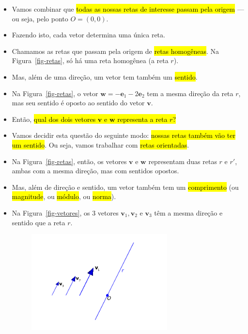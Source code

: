 \documentclass[
  letterpaper,
  DIV=11,
  numbers=noendperiod]{scrreprt}
\begin{document}
\begin{itemize}
\begin{figure}[htb]
  \end{figure}
\item
  Vamos combinar que {\hl{todas as nossas retas de interesse passam pela
  origem}} --- ou seja, pelo ponto $O=(0,0)$.
\item
  Fazendo isto, cada vetor determina uma única reta.
\item
  Chamamos as retas que passam pela origem de {\hl{retas homogêneas}}.
  Na Figura~\ref{fig-retas}, só há uma reta homogênea (a reta $r$).
\item
  Mas, além de uma direção, um vetor tem também um {\hl{sentido}}.
\item
  Na Figura~\ref{fig-retas}, o vetor
  $\mathbf{w} = -\mathbf{e}_{1} - 2\mathbf{e}_{2}$ tem a mesma direção
  da reta $r$, mas seu sentido é oposto ao sentido do vetor
  $\mathbf{v}$.
\item
  Então, {\hl{qual dos dois vetores $\mathbf{v}$ e $\mathbf{w}$
  representa a reta $r$?}}
\item
  Vamos decidir esta questão do seguinte modo: {\hl{nossas retas também
  vão ter um sentido}}. Ou seja, vamos trabalhar com {\hl{retas
  orientadas}}.
\item
  Na Figura~\ref{fig-retas}, então, os vetores $\mathbf{v}$ e
  $\mathbf{w}$ representam duas retas $r$ e $r'$, ambas com a mesma
  direção, mas com sentidos opostos.
\item
  Mas, além de direção e sentido, um vetor também tem um
  {\hl{comprimento}} (ou {\hl{magnitude}}, ou {\hl{módulo}}, ou
  {\hl{norma}}).
\item
  Na Figura~\ref{fig-vetores}, os $3$ vetores
  $\mathbf{v}_1, \mathbf{v}_2$ e $\mathbf{v}_3$ têm a mesma direção e
  sentido que a reta $r$.

  \begin{figure}[htb]

  {\centering \includegraphics[width=0.7\textwidth,height=\textheight]{figures/fig-reta-vetores.png}

}
\end{figure}
\end{itemize}
\end{document}
